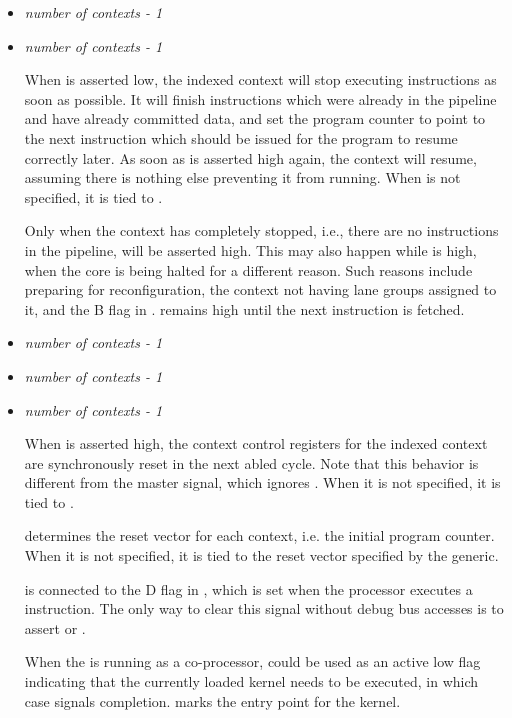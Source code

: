 \begin{itemize}
\vspace{1em}
\item {}\textit{number of contexts - 1}
\item {}\textit{number of contexts - 1}

When  is asserted low, the indexed context will stop 
executing instructions as soon as possible. It will finish instructions which 
were already in the pipeline and have already committed data, and set the 
program counter to point to the next instruction which should be issued for the 
program to resume correctly later. As soon as  is asserted
high again, the context will resume, assuming there is nothing else preventing
it from running. When  is not specified, it is tied to
.

Only when the context has completely stopped, i.e., there are no instructions in 
the pipeline, will  be asserted high. This may also happen 
while  is high, when the core is being halted for a different 
reason. Such reasons include preparing for reconfiguration, the context not 
having lane groups assigned to it, and the B flag in . 
 remains high until the next instruction is fetched.

\vspace{1em}
\item {}\textit{number of contexts - 1}
\item {}\textit{number of contexts - 1}
\item {}\textit{number of contexts - 1}

When  is asserted high, the context control registers for 
the indexed context are synchronously reset in the next abled cycle. 
Note that this behavior is different from the master  signal, which 
ignores . When it is not specified, it is tied to .

 determines the reset vector for each context, i.e. the
initial program counter. When it is not specified, it is tied to the reset
vector specified by the  generic.

 is connected to the D flag in , which is set when 
the processor executes a  instruction. The only way to clear this 
signal without debug bus accesses is to assert  or 
.

When the \rvex{} is running as a co-processor,  could be 
used as an active low flag indicating that the currently loaded kernel needs to 
be executed, in which case  signals completion.
 marks the entry point for the kernel.

\end{itemize}

